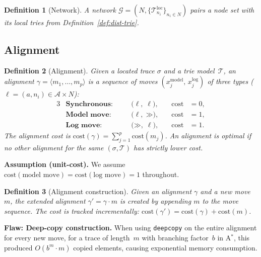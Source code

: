 \documentclass[11pt,a4paper]{article}
\newtheorem{definition}{Definition}
\newcommand{\A}{\mathcal{A}}
\newcommand{\Nodes}{N}
\newcommand{\Net}{\mathcal{G}}
\newcommand{\T}{\mathcal{T}}
\newcommand{\Tl}{\T^{\mathrm{loc}}}
\newcommand{\cost}{\mathrm{cost}}
\newcommand{\alignment}{\gamma}
\newcommand{\SKIP}{\mathord{\gg}}
\newcommand{\trace}{\sigma}
\begin{document}
\begin{definition}[Network]\label{def:network}
  A \emph{network}
  $\Net = (\Nodes, \{\Tl_{n_i}\}_{n_i \in \Nodes})$
  pairs a node set with its local tries from
  Definition~\ref{def:dist-trie}.
\end{definition}

\subsection{Alignment}

\begin{definition}[Alignment]\label{def:alignment}
  Given a located trace $\trace$ and a trie model~$\T$, an
  \emph{alignment}
  $\alignment = \langle m_1, \ldots, m_p \rangle$
  is a sequence of \emph{moves}
  $(x_j^{\mathrm{model}},\, x_j^{\mathrm{log}})$
  of three types ($\ell = (a, n_i) \in \A \times \Nodes$):
  \begin{alignat*}{3}
    &\textbf{Synchronous:}\quad
    &&\bigl(\ell,\;\ell\bigr),
    &\quad \cost &= 0,\\
    &\textbf{Model move:}\quad
    &&\bigl(\ell,\;\SKIP\bigr),
    &\quad \cost &= 1,\\
    &\textbf{Log move:}\quad
    &&\bigl(\SKIP,\;\ell\bigr),
    &\quad \cost &= 1.
  \end{alignat*}
  The alignment cost is
  $\cost(\alignment) = \sum_{j=1}^{p} \cost(m_j)$.
  An alignment is \emph{optimal} if no other alignment for the same
  $(\trace, \T)$ has strictly lower cost.
\end{definition}

\textbf{Assumption (unit-cost).}\;
We assume
$\cost(\text{model move}) = \cost(\text{log move}) = 1$
throughout.

\begin{definition}[Alignment construction]\label{def:alignment-construction}
  Given an alignment $\alignment$ and a new move~$m$, the extended
  alignment $\alignment' = \alignment \cdot m$ is created by appending
  $m$ to the move sequence.  The cost is tracked incrementally:
  $\cost(\alignment') = \cost(\alignment) + \cost(m)$.
\end{definition}

\begin{oldbox}
\textbf{Flaw: Deep-copy construction.}\;
When using \texttt{deepcopy} on the entire
alignment for every new move, for a trace of length~$m$ with branching
factor~$b$ in A$^{*}$, this produced $O(b^m \cdot m)$ copied elements,
causing exponential memory consumption.
\end{oldbox}
\end{document}
